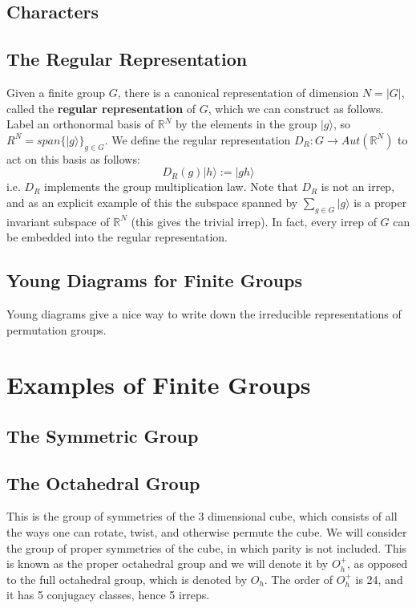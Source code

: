 \documentclass[11pt, oneside]{article}   	%
\theoremstyle{definition}
\begin{document}
\subsection{Characters}

\subsection{The Regular Representation}

Given a finite group $G$, there is a canonical representation of dimension $N = |G|$, called the \textbf{regular representation} 
of $G$, which we can construct as follows. Label an orthonormal basis of $\mathbb R^N$ by the elements in the group 
$|g\rangle$, so $R^N = span\{|g\rangle\}_{g\in G}$. We define the regular representation $D_R : G\rightarrow 
Aut(\mathbb R^N)$ to act on this basis as follows: 
\begin{equation}
	D_R(g)|h\rangle := |gh\rangle
\end{equation}
i.e. $D_R$ implements the group multiplication law. Note that $D_R$ is not an irrep, and as an explicit example of this 
the subspace spanned by $\sum_{g\in G}|g\rangle$ is a proper invariant subspace of $\mathbb R^N$ (this gives the 
trivial irrep). In fact, every irrep of $G$ can be embedded into the regular representation. 

\subsection{Young Diagrams for Finite Groups}

Young diagrams give a nice way to write down the irreducible representations of permutation groups. 

\section{Examples of Finite Groups}

\subsection{The Symmetric Group}

\subsection{The Octahedral Group}

This is the group of symmetries of the 3 dimensional cube, which consists of all the ways one can rotate, twist, and otherwise 
permute the cube. We will consider the group of proper symmetries of the cube, in which parity is not included. This is 
known as the proper octahedral group and we will denote it by $O_h^+$, as opposed to the full octahedral group, which 
is denoted by $O_h$. The order of $O_h^+$ is 24, and it has 5 conjugacy classes, hence 5 irreps. 
\end{document}
